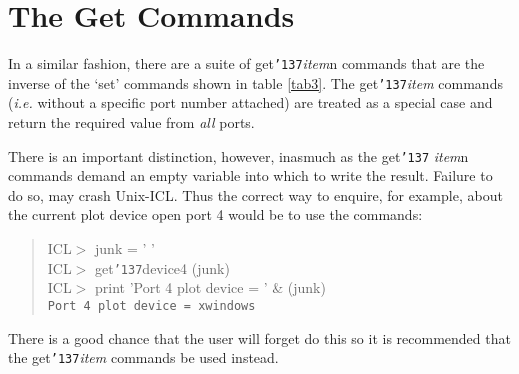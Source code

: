 \documentclass[a4paper]{book}
\renewcommand{\_}{{\tt\char'137}}
\begin{document}
\begin{table}




\end{table}

\section{The Get Commands}
In a similar fashion, there are a suite of get\_{\em item}n commands
that are the inverse of the `set' commands shown in table \ref{tab3}.
The get\_{\em item} commands ({\em i.e.} without a
specific port number attached) are treated as a special case and return
the required value from {\em all} ports.

There is an important distinction, however, inasmuch as the get\_{\em
item}n commands demand an empty variable into which to write the
result. Failure to do so, may crash Unix-ICL.  Thus the correct way to
enquire, for example, about the current plot device open port 4 would
be to use the commands:

\begin{quote}
  ICL$>$ junk = ' ' \\
  ICL$>$ get\_device4 (junk) \\
  ICL$>$ print 'Port 4 plot device = ' \& (junk) \\
  {\tt Port 4 plot device = xwindows }
\end{quote}

There is a good chance that the user will forget do this so it is recommended that
the get\_{\em item} commands be used instead.
\end{document}
